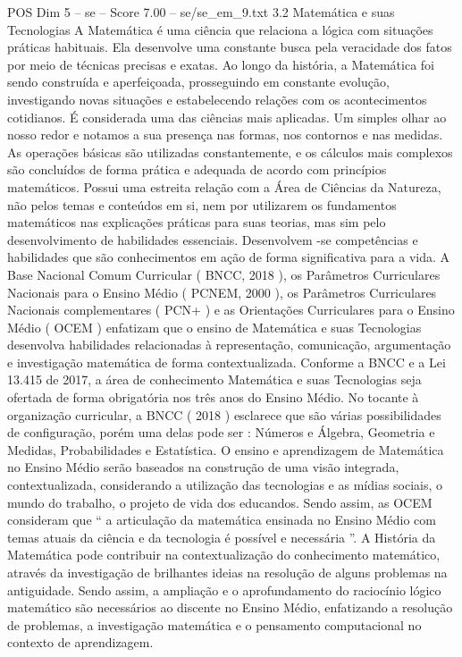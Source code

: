\begin{textsample}{POS Dim 5 – se – Score 7.00 – se/se\_em\_9.txt}  \label{ex:f5_pos_133}
3.2 Matemática e suas Tecnologias A Matemática é uma ciência que relaciona a lógica com situações práticas habituais.
Ela desenvolve uma constante busca pela veracidade dos fatos por meio de técnicas precisas e exatas.
Ao longo da história, a Matemática foi sendo construída e aperfeiçoada, prosseguindo em constante evolução, investigando novas situações e estabelecendo relações com os acontecimentos cotidianos.
É considerada uma das ciências mais aplicadas.
Um simples olhar ao nosso redor e notamos a sua presença nas formas, nos contornos e nas medidas.
As operações básicas são utilizadas constantemente, e os cálculos mais complexos são concluídos de forma prática e adequada de acordo com princípios matemáticos.
Possui uma estreita relação com a Área de Ciências da Natureza, não pelos temas e conteúdos em si, nem por utilizarem os fundamentos matemáticos nas explicações práticas para suas teorias, mas sim pelo desenvolvimento de habilidades essenciais.
Desenvolvem -se competências e habilidades que são conhecimentos em ação de forma significativa para a vida.
A Base Nacional Comum Curricular ( BNCC, 2018 ), os Parâmetros Curriculares Nacionais para o Ensino Médio ( PCNEM, 2000 ), os Parâmetros Curriculares Nacionais complementares ( PCN+ ) e as Orientações Curriculares para o Ensino Médio ( OCEM ) enfatizam que o ensino de Matemática e suas Tecnologias desenvolva habilidades relacionadas à representação, comunicação, argumentação e investigação matemática de forma contextualizada.
Conforme a BNCC e a Lei 13.415 de 2017, a área de conhecimento Matemática e suas Tecnologias seja ofertada de forma obrigatória nos três anos do Ensino Médio.
No tocante à organização curricular, a BNCC ( 2018 ) esclarece que são várias possibilidades de configuração, porém uma delas pode ser : Números e Álgebra, Geometria e Medidas, Probabilidades e Estatística.
O ensino e aprendizagem de Matemática no Ensino Médio serão baseados na construção de uma visão integrada, contextualizada, considerando a utilização das tecnologias e as mídias sociais, o mundo do trabalho, o projeto de vida dos educandos.
Sendo assim, as OCEM consideram que “ a articulação da matemática ensinada no Ensino Médio com temas atuais da ciência e da tecnologia é possível e necessária ”.
A História da Matemática pode contribuir na contextualização do conhecimento matemático, através da investigação de brilhantes ideias na resolução de alguns problemas na antiguidade.
Sendo assim, a ampliação e o aprofundamento do raciocínio lógico matemático são necessários ao discente no Ensino Médio, enfatizando a resolução de problemas, a investigação matemática e o pensamento computacional no contexto de aprendizagem.

\end{textsample}
